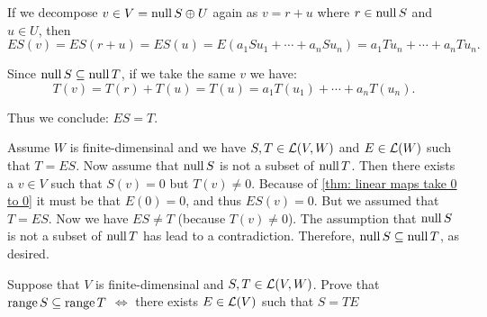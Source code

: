 \begin{xrcs}
\begin{prf}
   If we decompose $v \in V = \operatorname{null} S \oplus U$ again as $v = r + u$ where  $r \in \operatorname{null} S$ and $u \in U$, then
   \begin{equation}
     ES ( v ) = ES ( r + u) = ES( u) = E (a_1 S u_1 + \cdots + a_n S u_n) = a_1 T u_n + \cdots + a_n T u_n.
   \end{equation}

   Since $\operatorname{null} S \subseteq \operatorname{null} T$, if we take the same $v$ we have:
   \begin{equation}
     T(v) = T(r) + T(u) = T(u) = a_1 T(u_1) + \cdots + a_n T(u_n).
   \end{equation}

   Thus we conclude: $ES=T$.

   \Leftarrowdirection Assume $W$ is finite-dimensinal and we have $S,T \in \mathcal{L}(V,W)$ and $E \in \mathcal{L} (W)$ such that $T=ES$. Now assume that $\operatorname{null} S$ is not a subset of $\operatorname{null} T$. Then there exists a $v \in V$ such that $S(v) = 0$ but $T(v) \neq 0$. Because of \ref{thm: linear maps take 0 to 0} it must be that $E(0) = 0$, and thus $ES(v) = 0$. But we assumed that $T=ES$. Now we have $ES \neq T$ (because $T(v)\neq 0$). The assumption that $\operatorname{null} S$ is not a subset of $\operatorname{null} T$ has lead to a contradiction. Therefore, $\operatorname{null} S \subseteq \operatorname{null} T$, as desired.
  \end{prf}
\end{xrcs}

\begin{xrcs}
  Suppose that $V$ is finite-dimensinal and $S, T \in \mathcal{L} (V,W)$. Prove that $\operatorname{range} S \subseteq \operatorname{range} T$ $\iff$ there exists $E \in \mathcal{L}(V)$ such that $S=TE$

  \begin{prf}

  \end{prf}
\end{xrcs}
